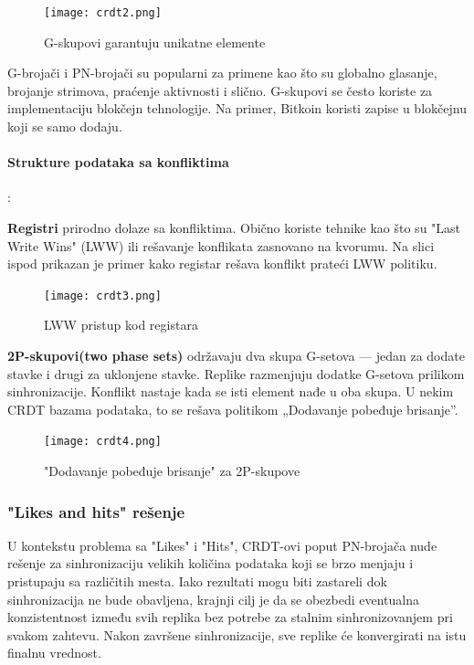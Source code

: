 \documentclass[12pt]{article}
\begin{document}
\begin{figure}[H]
	\centering
	\texttt{[image: crdt2.png]}
	\caption{G-skupovi garantuju unikatne elemente}
	\label{fig:nls_demo}
\end{figure}

G-brojači i PN-brojači su popularni za primene kao što su globalno glasanje, brojanje strimova, praćenje aktivnosti i slično. G-skupovi se često koriste za implementaciju blokčejn tehnologije. Na primer, Bitkoin koristi zapise u blokčejnu koji se samo dodaju.

\paragraph{Strukture podataka sa konfliktima}:

\textbf{Registri} prirodno dolaze sa konfliktima. Obično koriste tehnike kao što su "Last Write Wins" (LWW) ili rešavanje konflikata zasnovano na kvorumu. Na slici ispod prikazan je primer kako registar rešava konflikt prateći LWW politiku.

\begin{figure}[H]
	\centering
	\texttt{[image: crdt3.png]}
	\caption{LWW pristup kod registara}
	\label{fig:nls_demo}
\end{figure}

\textbf{2P-skupovi(two phase sets)} održavaju dva skupa G-setova — jedan za dodate stavke i drugi za uklonjene stavke. Replike razmenjuju dodatke G-setova prilikom sinhronizacije. Konflikt nastaje kada se isti element nađe u oba skupa. U nekim CRDT bazama podataka, to se rešava politikom „Dodavanje pobeđuje brisanje”.

\begin{figure}[H]
	\centering
	\texttt{[image: crdt4.png]}
	\caption{"Dodavanje pobeđuje brisanje" za 2P-skupove}
	\label{fig:nls_demo}
\end{figure}

\subsubsection{"Likes and hits" rešenje}

U kontekstu problema sa "Likes" i "Hits", CRDT-ovi poput PN-brojača nude rešenje za sinhronizaciju velikih količina podataka koji se brzo menjaju i pristupaju sa različitih mesta. Iako rezultati mogu biti zastareli dok sinhronizacija ne bude obavljena, krajnji cilj je da se obezbedi eventualna konzistentnost između svih replika bez potrebe za stalnim sinhronizovanjem pri svakom zahtevu. Nakon završene sinhronizacije, sve replike će konvergirati na istu finalnu vrednost.
\end{document}
